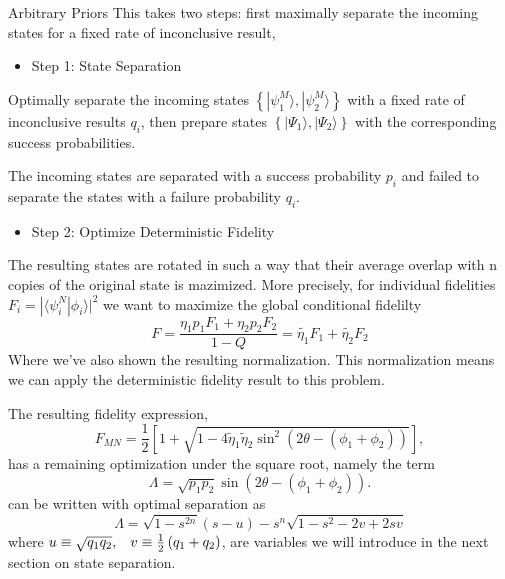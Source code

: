 \documentclass{beamer}
\newcommand{\ke}[1]{|#1\rangle}
\newcommand{\bk}[2]{\langle #1|#2\rangle}
\begin{document}
\begin{frame}{Arbitrary Priors}
This takes two steps: first maximally separate the incoming states for a fixed rate of inconclusive result, 
\begin{itemize}
\item Step 1: State Separation
\end{itemize}
Optimally separate the incoming states $\left\{ \ke{\psi_{1}^{M}},\ke{\psi_{2}^{M}}\right\} $
with a fixed rate of inconclusive results $q_{i}$, then prepare states
$\left\{ \ke{\Psi_{1}},\ke{\Psi_{2}}\right\} $ with the
corresponding success probabilities. 

The incoming states are separated with a success probability $p_{i}$
and failed to separate the states with a failure probability $q_{i}$.
\end{frame}
\begin{frame}
\begin{itemize}
\item Step 2: Optimize Deterministic Fidelity
\end{itemize}
The resulting states are rotated in such a way that their average overlap with n copies of the original state is mazimized. 
More precisely, for individual fidelities $F_i = |\bk{\psi_i^N}{\phi_i}|^2$ we want to maximize the global conditional fidelilty 
\[F = \frac{\eta_1 p_1 F_1 + \eta_2 p_2 F_2}{1-Q} = \tilde{\eta_1} F_1 + \tilde{\eta_2} F_2\]
Where we've also shown the resulting normalization.  This normalization means we can apply the deterministic fidelity result to this problem.
\end{frame}
\begin{frame}
The resulting fidelity expression,
\[F_{MN}  = \frac{1}{2}\left[1+\sqrt{1-4\tilde{\eta}_{1}\tilde{\eta}_{2}\sin^{2}\left(2\theta-\left(\phi_{1}+\phi_{2}\right)\right)}\right],\]
  has a remaining optimization under the square root, namely the term
\begin{equation*}
\Lambda =  \sqrt{p_{1}p_{2}}\sin\left(2\theta-\left(\phi_{1}+\phi_{2}\right)\right).
\end{equation*}
can be written with optimal separation as
\begin{equation*}
\Lambda = \sqrt{1-s^{2n}}\left(s-u\right)-s^{n}\sqrt{1-s^{2}-2v+2sv}
\end{equation*}
where $u\equiv\sqrt{q_{1}q_{2}},\hspace{0.3cm}v\equiv\frac{1}{2}\left(q_{1}+q_{2}\right)$, 
are variables we will introduce in the next section on state separation.
\end{frame}
\end{document}
